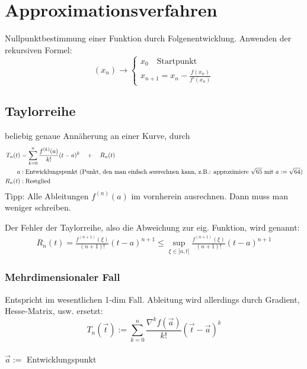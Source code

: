 \documentclass[a4paper]{article}
\begin{document}
\newpage
\section{Approximationsverfahren}

	\begin{fmerke}
		Nullpunktbestimmung einer Funktion durch Folgenentwicklung. Anwenden der rekursiven Formel:
		\vspace{-3mm}
		$$
		(x_n) \to \begin{cases}
							x_0 \quad \text{Startpunkt}\\
							x_{n+1} = x_n - \frac{f(x_n)}{f'(x_n)}
						\end{cases}
		$$
		\vspace{-3mm}
	\end{fmerke}
	\subsection{Taylorreihe}
		\begin{fdef}[Taylorreihe]
			beliebig genaue Annäherung an einer Kurve, durch\\[-4mm]
			\begin{align*}
				T_n(t)&= \sum_{k=0}^n {f^{(k)}(a) \over k!}(t-a)^k \quad + \quad R_n(t)\\
			 	a &: \text{Entwicklungspunkt (Punkt, den man einfach ausrechnen kann, z.B.: approximiere $\sqrt{65}$ mit $a := \sqrt{64}$)}\\
				R_n(t) &: \text{Restglied}\\
			\end{align*}
			Tipp: Alle Ableitungen $f^{(n)}(a)$ im vornherein ausrechnen. Dann muss man weniger schreiben.
		\end{fdef}
	
		\begin{fdef}
			Der Fehler der Taylorreihe, also die Abweichung zur eig. Funktion, wird  genannt:
			\begin{align*}
				R_{n}(t) = \frac{f^{(n+1)}(\xi)}{(n+1)!}(t-a)^{n+1} \leq \sup_{\xi \in ]a,t[} \frac{f^{(n+1)}(\xi)}{(n+1)!}(t-a)^{n+1}
			\end{align*}
			\vspace{-2mm}
		\end{fdef}
		\subsubsection{Mehrdimensionaler Fall}
		\begin{fdef}
			Entspricht im wesentlichen 1-dim Fall. Ableitung wird allerdings durch Gradient, Hesse-Matrix, usw. ersetzt:\\
				$$T_n(\vec{t}) := \sum_{k=0}^n \frac{\nabla^{k}f(\vec{a})}{k!}(\vec{t}-\vec{a})^k$$\\
			$\vec{a} := $ Entwicklungspunkt
			
		\end{fdef}
\end{document}
